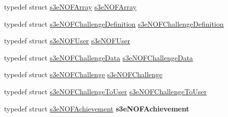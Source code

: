 \begin{DoxyCompactItemize}
\item 
typedef struct \hyperlink{structs3e_n_o_f_array}{s3eNOFArray} \hyperlink{group___n_open_feint_api_group_gafc79d5fb8f1516cf5b6c61edb910d510}{s3eNOFArray}
\item 
typedef struct \hyperlink{structs3e_n_o_f_challenge_definition}{s3eNOFChallengeDefinition} \hyperlink{group___n_open_feint_api_group_gabc8d488f663fbf90990f7436e14f2161}{s3eNOFChallengeDefinition}
\item 
typedef struct \hyperlink{structs3e_n_o_f_user}{s3eNOFUser} \hyperlink{group___n_open_feint_api_group_ga038694687b332e497536920f13f4b0f3}{s3eNOFUser}
\item 
typedef struct \hyperlink{structs3e_n_o_f_challenge_data}{s3eNOFChallengeData} \hyperlink{group___n_open_feint_api_group_ga836b6f1da3311a513c16676c0d6d6107}{s3eNOFChallengeData}
\item 
typedef struct \hyperlink{structs3e_n_o_f_challenge}{s3eNOFChallenge} \hyperlink{group___n_open_feint_api_group_ga025bd1c28b0fb4dfedb98023c92caee8}{s3eNOFChallenge}
\item 
typedef struct \hyperlink{structs3e_n_o_f_challenge_to_user}{s3eNOFChallengeToUser} \hyperlink{group___n_open_feint_api_group_ga7b4c00e0398b253d54165af119d4ad99}{s3eNOFChallengeToUser}
\item 
\hypertarget{group___n_open_feint_api_group_ga1e427d279a4d58b06bd45122984a5b00}{
typedef struct \hyperlink{structs3e_n_o_f_achievement}{s3eNOFAchievement} {\bfseries s3eNOFAchievement}}
\label{group___n_open_feint_api_group_ga1e427d279a4d58b06bd45122984a5b00}

\end{DoxyCompactItemize}
